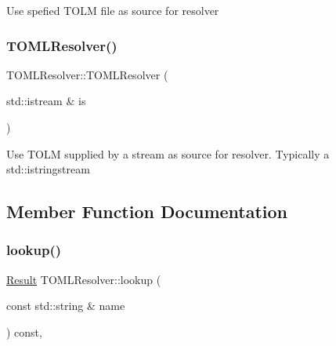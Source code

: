 Use spefied T\+O\+LM file as source for resolver \mbox{\label{classtheoria_1_1config_1_1TOMLResolver_a2772b7d149cabddd2b622b786720420f}} 
\subsubsection{\texorpdfstring{T\+O\+M\+L\+Resolver()}{TOMLResolver()}\hspace{0.1cm}{\footnotesize\ttfamily [2/2]}}
{\footnotesize\ttfamily T\+O\+M\+L\+Resolver\+::\+T\+O\+M\+L\+Resolver (\begin{DoxyParamCaption}\item[{std\+::istream \&}]{is }\end{DoxyParamCaption})}

Use T\+O\+LM supplied by a stream as source for resolver. Typically a std\+::istringstream 

\subsection{Member Function Documentation}
\mbox{\label{classtheoria_1_1config_1_1TOMLResolver_a42daff166eca2c9c9dd77868faf0122d}} 
\subsubsection{\texorpdfstring{lookup()}{lookup()}}
{\footnotesize\ttfamily \hyperlink{classtheoria_1_1config_1_1ConfigVariableResolver_af27a85262d802c9ad4ecb1179efaf447}{Result} T\+O\+M\+L\+Resolver\+::lookup (\begin{DoxyParamCaption}\item[{const std\+::string \&}]{name }\end{DoxyParamCaption}) const\hspace{0.3cm}{\ttfamily [override]}, {\ttfamily [virtual]}}

